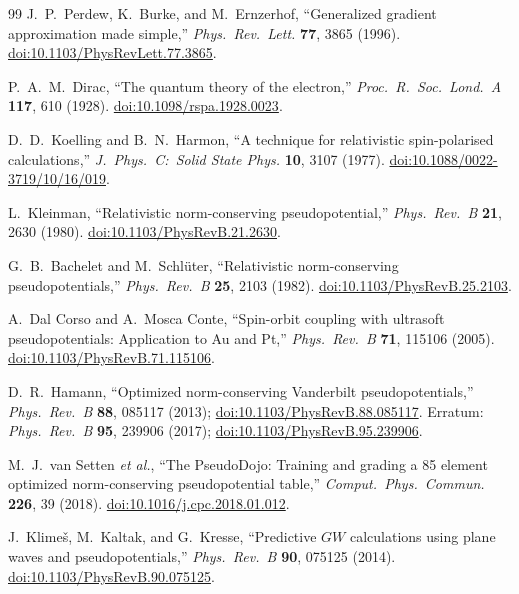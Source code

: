\documentclass[11pt]{article}
\begin{document}
\begin{thebibliography}{99}
J.~P.~Perdew, K.~Burke, and M.~Ernzerhof,
``Generalized gradient approximation made simple,''
\textit{Phys.\ Rev.\ Lett.} \textbf{77}, 3865 (1996).
\href{https://doi.org/10.1103/PhysRevLett.77.3865}{doi:10.1103/PhysRevLett.77.3865}.

P.~A.~M.~Dirac,
``The quantum theory of the electron,''
\textit{Proc.\ R.\ Soc.\ Lond.\ A} \textbf{117}, 610 (1928).
\href{https://doi.org/10.1098/rspa.1928.0023}{doi:10.1098/rspa.1928.0023}.

D.~D.~Koelling and B.~N.~Harmon,
``A technique for relativistic spin-polarised calculations,''
\textit{J.\ Phys.\ C:\ Solid State Phys.} \textbf{10}, 3107 (1977).
\href{https://doi.org/10.1088/0022-3719/10/16/019}{doi:10.1088/0022-3719/10/16/019}.

L.~Kleinman,
``Relativistic norm-conserving pseudopotential,''
\textit{Phys.\ Rev.\ B} \textbf{21}, 2630 (1980).
\href{https://doi.org/10.1103/PhysRevB.21.2630}{doi:10.1103/PhysRevB.21.2630}.

G.~B.~Bachelet and M.~Schl\"uter,
``Relativistic norm-conserving pseudopotentials,''
\textit{Phys.\ Rev.\ B} \textbf{25}, 2103 (1982).
\href{https://doi.org/10.1103/PhysRevB.25.2103}{doi:10.1103/PhysRevB.25.2103}.

A.~Dal Corso and A.~Mosca Conte,
``Spin-orbit coupling with ultrasoft pseudopotentials: Application to Au and Pt,''
\textit{Phys.\ Rev.\ B} \textbf{71}, 115106 (2005).
\href{https://doi.org/10.1103/PhysRevB.71.115106}{doi:10.1103/PhysRevB.71.115106}.

D.~R.~Hamann,
``Optimized norm-conserving Vanderbilt pseudopotentials,''
\textit{Phys.\ Rev.\ B} \textbf{88}, 085117 (2013);
\href{https://doi.org/10.1103/PhysRevB.88.085117}{doi:10.1103/PhysRevB.88.085117}.
Erratum: \textit{Phys.\ Rev.\ B} \textbf{95}, 239906 (2017);
\href{https://doi.org/10.1103/PhysRevB.95.239906}{doi:10.1103/PhysRevB.95.239906}.

M.~J.~van Setten \textit{et al.},
``The PseudoDojo: Training and grading a 85 element optimized norm-conserving
pseudopotential table,''
\textit{Comput.\ Phys.\ Commun.} \textbf{226}, 39 (2018).
\href{https://doi.org/10.1016/j.cpc.2018.01.012}{doi:10.1016/j.cpc.2018.01.012}.

J.~Klime\v{s}, M.~Kaltak, and G.~Kresse,
``Predictive $GW$ calculations using plane waves and pseudopotentials,''
\textit{Phys.\ Rev.\ B} \textbf{90}, 075125 (2014).
\href{https://doi.org/10.1103/PhysRevB.90.075125}{doi:10.1103/PhysRevB.90.075125}.


\end{thebibliography}
\end{document}
